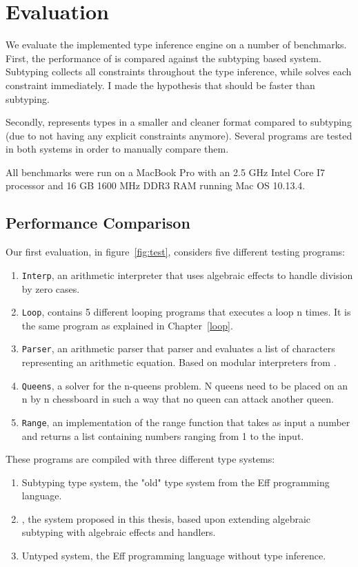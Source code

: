 \section{Evaluation}\label{eval}
We evaluate the implemented type inference engine on a number of benchmarks. First, the performance of \core is compared against the subtyping based system. Subtyping collects all constraints throughout the type inference, while \core solves each constraint immediately. I made the hypothesis that \core should be faster than subtyping. 

Secondly, \core represents types in a smaller and cleaner format compared to subtyping (due to not having any explicit constraints anymore). Several programs are tested in both systems in order to manually compare them. 

All benchmarks were run on a MacBook Pro with an 2.5 GHz Intel Core I7 processor and 16 GB 1600 MHz DDR3 RAM running Mac OS 10.13.4.

\subsection{Performance Comparison}\label{performance}
Our first evaluation, in figure~\ref{fig:test}, considers five different testing programs:
\begin{enumerate}
\item \texttt{Interp}, an arithmetic interpreter that uses algebraic effects to handle division by zero cases.
\item \texttt{Loop}, contains 5 different looping programs that executes a loop n times. It is the same program as explained in Chapter~\ref{loop}.
\item \texttt{Parser}, an arithmetic parser that parser and evaluates a list of characters representing an arithmetic equation. Based on modular interpreters from \cite{Liang:1995:MTM:199448.199528}.
\item \texttt{Queens}, a solver for the n-queens problem. N queens need to be placed on an n by n chessboard in such a way that no queen can attack another queen. 
\item \texttt{Range}, an implementation of the range function that takes as input a number and returns a list containing numbers ranging from 1 to the input.
\end{enumerate}
These programs are compiled with three different type systems:
\begin{enumerate}
\item Subtyping type system, the "old" type system from the Eff programming language. 
\item \core, the system proposed in this thesis, based upon extending algebraic subtyping with algebraic effects and handlers.
\item Untyped system, the Eff programming language without type inference.
\end{enumerate}

